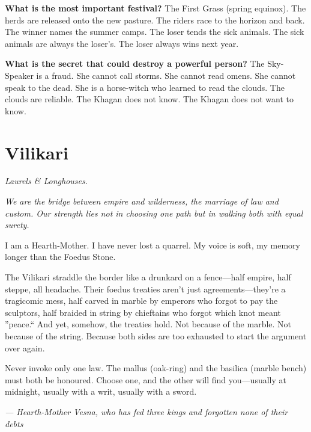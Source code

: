\begin{almanac}
\textbf{What is the most important festival?} The First Grass (spring equinox). The herds are released onto the new pasture. The riders race to the horizon and back. The winner names the summer camps. The loser tends the sick animals. The sick animals are always the loser's. The loser always wins next year.

\textbf{What is the secret that could destroy a powerful person?} The Sky-Speaker is a fraud. She cannot call storms. She cannot read omens. She cannot speak to the dead. She is a horse-witch who learned to read the clouds. The clouds are reliable. The Khagan does not know. The Khagan does not want to know.
\end{almanac}

\newpage

\newpage

\chapter{Vilikari}
\emph{Laurels \& Longhouses.}

\noindent
{\Large
\textit{We are the bridge between empire and wilderness, the marriage of law and custom. Our strength lies not in choosing one path but in walking both with equal surety.}

\vspace{0.5em}

I am a Hearth-Mother. I have never lost a quarrel. My voice is soft, my memory longer than the Foedus Stone.

\vspace{0.5em}

The Vilikari straddle the border like a drunkard on a fence---half empire, half steppe, all headache. Their foedus treaties aren't just agreements---they're a tragicomic mess, half carved in marble by emperors who forgot to pay the sculptors, half braided in string by chieftains who forgot which knot meant ''peace.`` And yet, somehow, the treaties hold. Not because of the marble. Not because of the string. Because both sides are too exhausted to start the argument over again.

\vspace{0.5em}

Never invoke only one law. The mallus (oak-ring) and the basilica (marble bench) must both be honoured. Choose one, and the other will find you---usually at midnight, usually with a writ, usually with a sword.

\vspace{1em}

\noindent\textit{--- Hearth-Mother Vesna, who has fed three kings and forgotten none of their debts}
}

